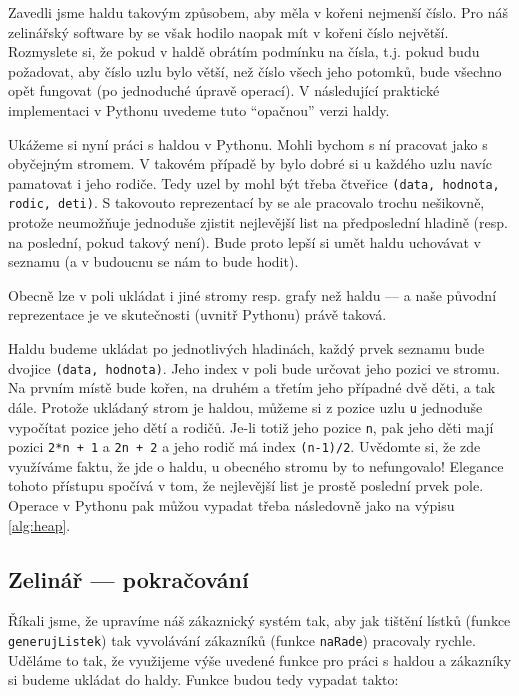 Zavedli jsme haldu takovým způsobem, aby měla v kořeni nejmenší číslo. Pro náš zelinářský software by se však
hodilo naopak mít v kořeni číslo největší. Rozmyslete si, že pokud v haldě obrátím podmínku na čísla, t.j. pokud budu požadovat,
aby číslo uzlu bylo větší, než číslo všech jeho potomků, bude všechno opět fungovat (po jednoduché úpravě operací). V následující
praktické implementaci v Pythonu uvedeme tuto ``opačnou'' verzi haldy.

Ukážeme si nyní práci s haldou v Pythonu. Mohli bychom s ní pracovat jako s obyčejným stromem. V takovém případě by bylo dobré si u každého
uzlu navíc pamatovat i jeho rodiče. Tedy uzel by mohl být třeba čtveřice {\tt (data, hodnota, rodic, deti)}. S takovouto reprezentací
by se ale pracovalo trochu nešikovně, protože neumožňuje jednoduše zjistit nejlevější list na předposlední hladině (resp. na poslední, pokud takový není).
Bude proto lepší si umět haldu uchovávat v seznamu (a v budoucnu se nám to bude hodit).

\begin{todo}
Obecně lze v poli ukládat i jiné stromy resp. grafy než haldu --- a naše původní reprezentace je ve skutečnosti (uvnitř Pythonu)
právě taková.
\end{todo}

Haldu budeme ukládat po jednotlivých hladinách, každý prvek seznamu bude dvojice {\tt (data, hodnota)}. Jeho index v poli bude určovat jeho pozici ve stromu.
Na prvním místě bude kořen, na druhém a třetím jeho případné dvě děti, a tak dále. Protože ukládaný strom je haldou, můžeme si z pozice uzlu {\tt u} jednoduše vypočítat
pozice jeho dětí a rodičů. Je-li totiž jeho pozice {\tt n}, pak jeho děti mají pozici {\tt 2*n + 1} a {\tt 2n + 2} a jeho rodič má index
{\tt (n-1)/2}. Uvědomte si, že zde využíváme faktu, že jde o haldu, u obecného stromu by to nefungovalo! Elegance tohoto přístupu spočívá v tom,
že nejlevější list je prostě poslední prvek pole. Operace v Pythonu pak můžou vypadat třeba následovně jako na výpisu \ref{alg:heap}.



\subsection*{Zelinář --- pokračování}

Říkali jsme, že upravíme náš zákaznický systém tak, aby jak tištění lístků (funkce {\tt generujListek}) tak vyvolávání zákazníků
(funkce {\tt naRade}) pracovaly rychle. Uděláme to tak, že využijeme výše uvedené funkce pro práci s haldou a zákazníky si budeme
ukládat do haldy. Funkce budou tedy vypadat takto:

